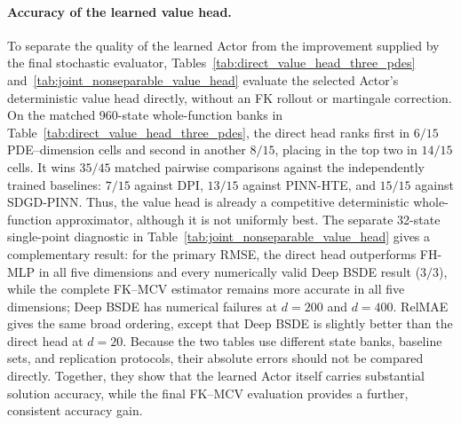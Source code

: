 \paragraph{Accuracy of the learned value head.}
To separate the quality of the learned Actor from the improvement supplied by
the final stochastic evaluator, Tables~\ref{tab:direct_value_head_three_pdes}
and~\ref{tab:joint_nonseparable_value_head} evaluate the selected Actor's
deterministic value head directly, without an FK rollout or martingale
correction.  On the matched 960-state whole-function banks in
Table~\ref{tab:direct_value_head_three_pdes}, the direct head ranks first in
$6/15$ PDE--dimension cells and second in another $8/15$, placing in the top
two in $14/15$ cells.  It wins $35/45$ matched pairwise comparisons against
the independently trained baselines: $7/15$ against DPI, $13/15$ against
PINN-HTE, and $15/15$ against SDGD-PINN.  Thus, the value head is already a
competitive deterministic whole-function approximator, although it is not
uniformly best.  The separate 32-state single-point diagnostic in
Table~\ref{tab:joint_nonseparable_value_head} gives a complementary result:
for the primary RMSE, the direct head outperforms FH-MLP in all five dimensions
and every numerically valid Deep BSDE result ($3/3$), while the complete
FK--MCV estimator remains more accurate in all five dimensions; Deep BSDE has
numerical failures at $d=200$ and $d=400$.  RelMAE gives the same broad
ordering, except that Deep BSDE is slightly better than the direct head at
$d=20$.  Because the two tables use different state banks, baseline sets, and
replication protocols, their absolute errors should not be compared directly.
Together, they show that the learned Actor itself carries substantial solution
accuracy, while the final FK--MCV evaluation provides a further, consistent
accuracy gain.
